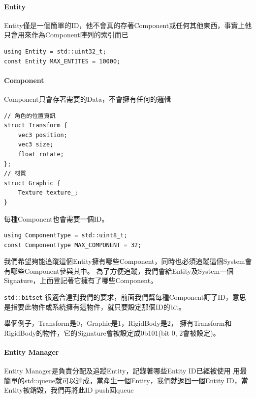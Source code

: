 \paragraph{Entity}

Entity僅是一個簡單的ID，他不會真的存著Component或任何其他東西，事實上他只會用來作為Component陣列的索引而已

\begin{lstlisting}
using Entity = std::uint32_t;
const Entity MAX_ENTITES = 10000;
\end{lstlisting}

\paragraph{Component}

Component只會存著需要的Data，不會擁有任何的邏輯

\begin{lstlisting}
// 角色的位置資訊
struct Transform {
    vec3 position;
    vec3 size;
    float rotate;
};
// 材質
struct Graphic {
    Texture texture_;
}
\end{lstlisting}

每種Component也會需要一個ID。

\begin{lstlisting}
using ComponentType = std::uint8_t;
const ComponentType MAX_COMPONENT = 32;
\end{lstlisting}

我們希望夠能追蹤這個Entity擁有哪些Component，同時也必須追蹤這個System會有哪些Component參與其中。
為了方便追蹤，我們會給Entity及System一個Signature，上面登記著它擁有了哪些Component。

\lstinline{std::bitset} 很適合達到我們的要求，前面我們幫每種Component訂了ID，意思是指要此物件或系統擁有這物件，就只要設定那個ID的bit。

舉個例子，Transform是0，Graphic是1，RigidBody是2，
擁有Transform和RigidBody的物件，它的Signature會被設定成0b101(bit 0, 2會被設定)。

\paragraph{Entity Manager}

Entity Manager是負責分配及追蹤Entity，記錄著哪些Entity ID已經被使用
用最簡單的std::queue就可以達成，當產生一個Entity，我們就返回一個Entity ID，當Entity被銷毀，我們再將此ID push回queue

